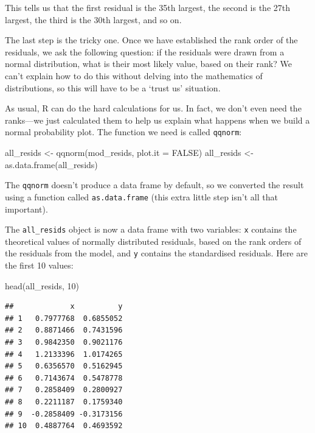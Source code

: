\documentclass[
]{book}
\newenvironment{Shaded}{\begin{snugshade}}{\end{snugshade}}
\newcommand{\AttributeTok}[1]{\textcolor[rgb]{0.77,0.63,0.00}{#1}}
\newcommand{\ConstantTok}[1]{\textcolor[rgb]{0.00,0.00,0.00}{#1}}
\newcommand{\DecValTok}[1]{\textcolor[rgb]{0.00,0.00,0.81}{#1}}
\newcommand{\FunctionTok}[1]{\textcolor[rgb]{0.00,0.00,0.00}{#1}}
\newcommand{\NormalTok}[1]{#1}
\newcommand{\OtherTok}[1]{\textcolor[rgb]{0.56,0.35,0.01}{#1}}
\begin{document}
This tells us that the first residual is the 35th largest, the second is the 27th largest, the third is the 30th largest, and so on.

The last step is the tricky one. Once we have established the rank order of the residuals, we ask the following question: if the residuals were drawn from a normal distribution, what is their most likely value, based on their rank? We can't explain how to do this without delving into the mathematics of distributions, so this will have to be a `trust us' situation.

As usual, R can do the hard calculations for us. In fact, we don't even need the ranks---we just calculated them to help us explain what happens when we build a normal probability plot. The function we need is called \texttt{qqnorm}:

\begin{Shaded}
\begin{Highlighting}[]
\NormalTok{all\_resids }\OtherTok{\textless{}{-}} \FunctionTok{qqnorm}\NormalTok{(mod\_resids, }\AttributeTok{plot.it =} \ConstantTok{FALSE}\NormalTok{)}
\NormalTok{all\_resids }\OtherTok{\textless{}{-}} \FunctionTok{as.data.frame}\NormalTok{(all\_resids)}
\end{Highlighting}
\end{Shaded}

The \texttt{qqnorm} doesn't produce a data frame by default, so we converted the result using a function called \texttt{as.data.frame} (this extra little step isn't all that important).

The \texttt{all\_resids} object is now a data frame with two variables: \texttt{x} contains the theoretical values of normally distributed residuals, based on the rank orders of the residuals from the model, and \texttt{y} contains the standardised residuals. Here are the first 10 values:

\begin{Shaded}
\begin{Highlighting}[]
\FunctionTok{head}\NormalTok{(all\_resids, }\DecValTok{10}\NormalTok{)}
\end{Highlighting}
\end{Shaded}

\begin{verbatim}
##             x          y
## 1   0.7977768  0.6855052
## 2   0.8871466  0.7431596
## 3   0.9842350  0.9021176
## 4   1.2133396  1.0174265
## 5   0.6356570  0.5162945
## 6   0.7143674  0.5478778
## 7   0.2858409  0.2800927
## 8   0.2211187  0.1759340
## 9  -0.2858409 -0.3173156
## 10  0.4887764  0.4693592
\end{verbatim}
\end{document}
